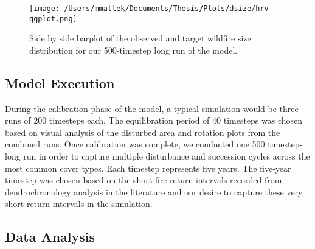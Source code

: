 

\begin{figure}[!htbp]
  \centering
    \centering
    \texttt{[image: /Users/mmallek/Documents/Thesis/Plots/dsize/hrv-ggplot.png]}
  \caption{Side by side barplot of the observed and target wildfire size distribution for our 500-timestep long run of the model.}
  \label{fig:dsize}
\end{figure}

\subsection{Model Execution}
During the calibration phase of the model, a typical simulation would be three runs of 200 timesteps each. The equilibration period of 40 timesteps was chosen based on visual analysis of the disturbed area and rotation plots from the combined runs. Once calibration was complete, we conducted one 500 timestep-long run in order to capture multiple disturbance and succession cycles across the most common cover types. Each timestep represents five years. The five-year timestep was chosen based on the short fire return intervals recorded from dendrochronology analysis in the literature and our desire to capture these very short return intervals in the simulation.

\subsection{Data Analysis}
\label{subsec:dataanalysis}

